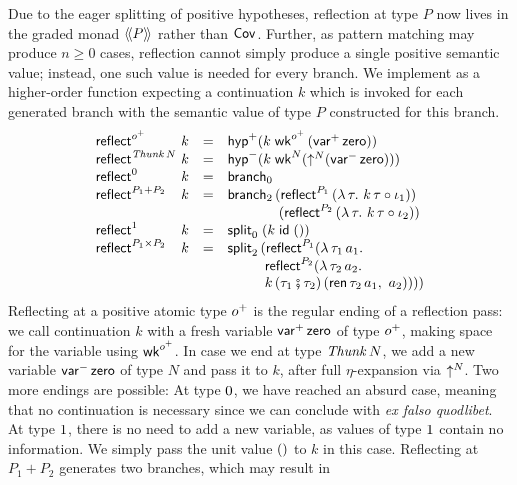 \documentclass[sigplan,screen,fleqn,review]{acmart} %
\begin{document}
Due to the eager splitting of positive hypotheses, reflection at type $P$
now lives in the graded monad $\langle\!\langle P \rangle\!\rangle$ rather than $\mathsf{Cov}^{}$.  Further,
as pattern matching may produce $n \geq 0$ cases, reflection cannot simply
produce a single positive semantic value; instead, one such value is needed
for every branch.  We implement
as a higher-order function expecting a continuation $k$ which is
invoked for each generated branch with the semantic value of type $P$
constructed for this branch.
\[
\renewcommand{\left}{}
\renewcommand{\right}{}
\begin{array}{l@{~}lcl}
  \reflect {\patom} & k & = &
    \phyp \left( k\;\twk^{\patom}\,(\pvar\,\tzero) \right) \\
  \reflect {\Thunk N} & k & = &
    \nhyp \left( k\;\twk^N \left( \up N (\nvar\,\tzero) \right) \right)\\
  \reflect {\tyzero} & k & = & \nbranch \\
  \reflect {P_1 + P_2} & k & = & \bbranch
    \,\left( \treflect^{P_1}\,(\lambda\,\tau. \ k\,\tau \comp \iota_1) \right)
\\ &&& \qquad \quad \ \,
    \,\left( \treflect^{P_2}\,(\lambda\,\tau. \ k\,\tau \comp \iota_2) \right)
    \\
  \reflect{\tyone} & k & = & \nsplit\;(k\;\tid\;\ttempty) \\
  \reflect{P_1 \times P_2} & k & = & \bsplit
    \,\left(
      \treflect^{P_1} \left( \lambda\,\tau_1\,a_1. \
\\ &&& \qquad \ \
      \treflect^{P_2} \left( \lambda\,\tau_2\,a_2. \
\\ &&& \qquad \ \
        k\, (\tau_1 \rcomp \tau_2)\, (\tren\,\tau_2\,a_1, \ a_2)
        \right)
      \right)
    \right)
\end{array}
\]
Reflecting at a positive atomic type $o^+$ is the regular ending of a
reflection pass: we call continuation $k$ with a fresh variable
$\mathsf{var}^{+}\,\mathsf{zero}$ of type $o^+$, making space for the variable
using $\mathsf{wk}^{o^+}$.
In case we end at type $\mathit{Thunk}\,N$, we add a new variable
$\mathsf{var}^{-}\,\mathsf{zero}$ of type $N$ and pass it to $k$, after full
$\eta$-expansion via $\mathord{\uparrow_{}^{N}}$.  Two more endings are possible:
At type
$0$, we have reached an absurd case, meaning that no
continuation is necessary since we can conclude with
\emph{ex falso quodlibet}.
At type $1$, there is no need to add a new variable, as values
of type $1$ contain no information.  We simply pass the unit
value $()$ to $k$ in this case.
Reflecting at $P_1 + P_2$ generates two branches, which may result in
\end{document}

